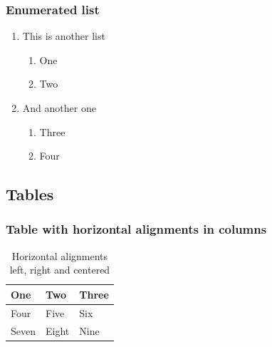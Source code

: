 \documentclass{article}
\begin{document}
        \subsubsection{Enumerated list}
        \begin{enumerate}
            \item This is another list
            \begin{enumerate}
                \item One 
                \item Two
            \end{enumerate}
            \item And another one
            \begin{enumerate}
                \item Three
                \item Four
            \end{enumerate}
        \end{enumerate}
    
    \subsection{Tables}
        \subsubsection{Table with horizontal alignments in columns}
            \begin{table}[!h]
                \begin{tabularx} {0.5\textwidth} {
                    | >{\raggedright\arraybackslash}X 
                    | >{\centering\arraybackslash}X 
                    | >{\raggedleft\arraybackslash}X | }
                    \hline
                    One & Two & Three \\ \hline
                    Four & Five & Six \\ \hline
                    Seven & Eight & Nine \\ \hline
                \end{tabularx}
                \centering
                \caption{Horizontal alignments left, right and centered}
                \label{table:numbers}
            \end{table}
            
\end{document}
